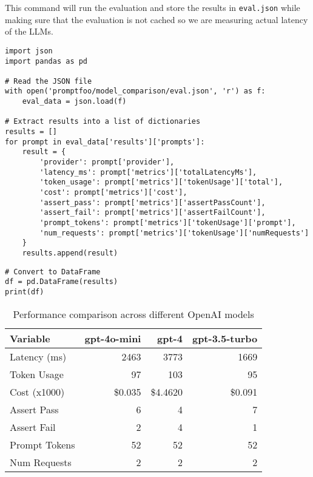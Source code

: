 This command will run the evaluation and store the results in \texttt{eval.json} while making sure that the evaluation is not cached so we are measuring actual latency of the LLMs.~
\begin{verbatim}
import json
import pandas as pd

# Read the JSON file
with open('promptfoo/model_comparison/eval.json', 'r') as f:
    eval_data = json.load(f)

# Extract results into a list of dictionaries
results = []
for prompt in eval_data['results']['prompts']:
    result = {
        'provider': prompt['provider'],
        'latency_ms': prompt['metrics']['totalLatencyMs'],
        'token_usage': prompt['metrics']['tokenUsage']['total'],
        'cost': prompt['metrics']['cost'],
        'assert_pass': prompt['metrics']['assertPassCount'], 
        'assert_fail': prompt['metrics']['assertFailCount'],
        'prompt_tokens': prompt['metrics']['tokenUsage']['prompt'],
        'num_requests': prompt['metrics']['tokenUsage']['numRequests']
    }
    results.append(result)
\end{verbatim}


\begin{verbatim}
# Convert to DataFrame
df = pd.DataFrame(results)
print(df)
\end{verbatim}

\begin{table}
\centering
\begin{tabular}{|l|r|r|r|}
\hline
Variable & gpt-4o-mini & gpt-4 & gpt-3.5-turbo \\
\hline
Latency (ms) & 2463 & 3773 & 1669 \\
Token Usage & 97 & 103 & 95 \\
Cost (x1000) & \$0.035 & \$4.4620 & \$0.091 \\
Assert Pass & 6 & 4 & 7 \\
Assert Fail & 2 & 4 & 1 \\
Prompt Tokens & 52 & 52 & 52 \\
Num Requests & 2 & 2 & 2 \\
\hline
\end{tabular}
\caption{Performance comparison across different OpenAI models}
\label{tab:model-comparison}
\end{table}

